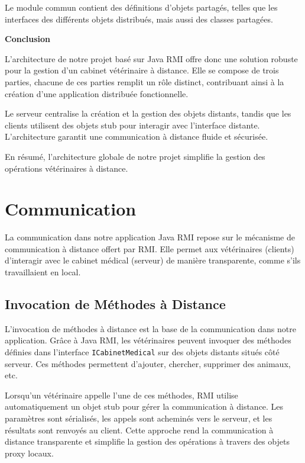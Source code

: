 \documentclass{article} %
\begin{document}
Le module commun contient des définitions d'objets partagés, telles que les interfaces des différents 
objets distribués, mais aussi des classes partagées. 

\bigskip
\textbf{Conclusion}
\bigskip

L'architecture de notre projet basé sur Java RMI offre donc une solution robuste 
pour la gestion d'un cabinet vétérinaire à distance. 
Elle se compose de trois parties, chacune de ces parties remplit un rôle distinct, 
contribuant ainsi à la création d'une application distribuée fonctionnelle.

Le serveur centralise la création et la gestion des objets distants, 
tandis que les clients utilisent des objets stub pour interagir avec l'interface distante. 
L'architecture garantit une communication à distance fluide et sécurisée.

En résumé, l'architecture globale de notre projet simplifie la gestion des 
opérations vétérinaires à distance.

\newpage
\section{Communication}

La communication dans notre application Java RMI repose sur le mécanisme de 
communication à distance offert par RMI. 
Elle permet aux vétérinaires (clients) d'interagir avec le cabinet médical (serveur) 
de manière transparente, comme s'ils travaillaient en local.

\subsection{Invocation de Méthodes à Distance}

L'invocation de méthodes à distance est la base de la communication dans notre application. 
Grâce à Java RMI, les vétérinaires peuvent invoquer des méthodes 
définies dans l'interface \texttt{ICabinetMedical} sur des objets distants situés côté serveur. 
Ces méthodes permettent d'ajouter, chercher, supprimer des animaux, etc.

Lorsqu'un vétérinaire appelle l'une de ces méthodes, 
RMI utilise automatiquement un objet stub pour gérer la communication à distance. 
Les paramètres sont sérialisés, les appels sont acheminés vers le serveur, 
et les résultats sont renvoyés au client. Cette approche rend la communication à distance transparente 
et simplifie la gestion des opérations à travers des objets proxy locaux.
\end{document}
